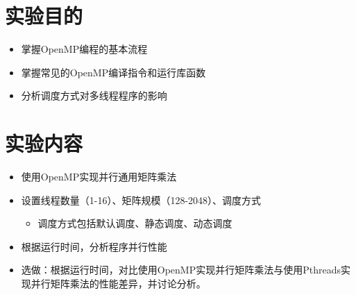 \documentclass{SYSUReport}
\date{2025年4月23日}
\begin{document}
\cover
\thispagestyle{empty} %
\clearpage



\section{实验目的}
\begin{itemize}
    \item 掌握OpenMP编程的基本流程
    \item 掌握常见的OpenMP编译指令和运行库函数
    \item 分析调度方式对多线程程序的影响
\end{itemize}

\section{实验内容}
\begin{itemize}
 \item 使用OpenMP实现并行通用矩阵乘法
\item 设置线程数量（1-16）、矩阵规模（128-2048）、调度方式
\begin{itemize}
    \item 调度方式包括默认调度、静态调度、动态调度
\end{itemize}
\item 根据运行时间，分析程序并行性能
\item 选做：根据运行时间，对比使用OpenMP实现并行矩阵乘法与使用Pthreads实现并行矩阵乘法的性能差异，并讨论分析。
\end{itemize}
\end{document}
